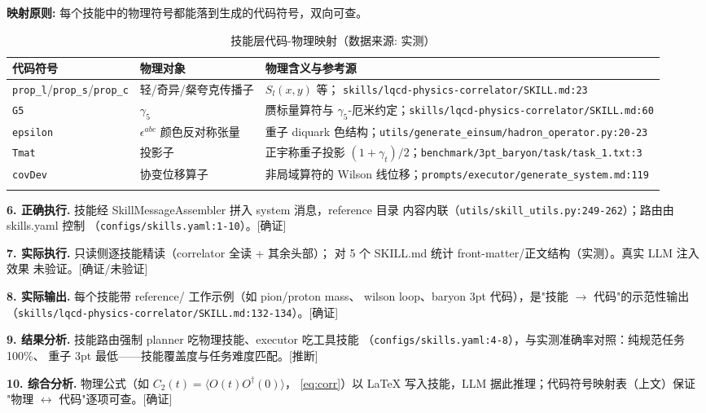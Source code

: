 \documentclass[UTF8]{ctexart}
\begin{document}
\begin{mapbox}
\textbf{映射原则:} 每个技能中的物理符号都能落到生成的代码符号，双向可查。
\end{mapbox}

\begin{xltabular}{\textwidth}{llX}
\toprule
\textcolor{map}{代码符号} & 物理对象 & 物理含义与参考源 \\
\midrule
\endhead
\texttt{prop\_l}/\texttt{prop\_s}/\texttt{prop\_c} & 轻/奇异/粲夸克传播子 & $S_l(x,y)$ 等；
\texttt{\nolinkurl{skills/lqcd-physics-correlator/SKILL.md:23}} \\
\texttt{G5} & $\gamma_5$ & 赝标量算符与 $\gamma_5$-厄米约定；\texttt{\nolinkurl{skills/lqcd-physics-correlator/SKILL.md:60}} \\
\texttt{epsilon} & $\epsilon^{abc}$ 颜色反对称张量 & 重子 diquark 色结构；\texttt{\nolinkurl{utils/generate_einsum/hadron_operator.py:20-23}} \\
\texttt{Tmat} & 投影子 & 正宇称重子投影 $(1+\gamma_t)/2$；\texttt{\nolinkurl{benchmark/3pt_baryon/task/task_1.txt:3}} \\
\texttt{covDev} & 协变位移算子 & 非局域算符的 Wilson 线位移；\texttt{\nolinkurl{prompts/executor/generate_system.md:119}} \\
\bottomrule
\caption{技能层代码-物理映射（数据来源: 实测）}
\end{xltabular}

\noindent\textbf{6. 正确执行.} 技能经 SkillMessageAssembler 拼入 system 消息，reference 目录
内容内联（\texttt{\nolinkurl{utils/skill_utils.py:249-262}}）；路由由 skills.yaml 控制
（\texttt{\nolinkurl{configs/skills.yaml:1-10}}）。[确证]

\noindent\textbf{7. 实际执行.} 只读侧逐技能精读（correlator 全读 + 其余头部）；
对 5 个 SKILL.md 统计 front-matter/正文结构（实测）。真实 LLM 注入效果 \textcolor{warn}{未验证}。[确证/未验证]

\noindent\textbf{8. 实际输出.} 每个技能带 reference/ 工作示例（如 pion/proton mass、
wilson loop、baryon 3pt 代码），是"技能 $\rightarrow$ 代码"的示范性输出
（\texttt{\nolinkurl{skills/lqcd-physics-correlator/SKILL.md:132-134}}）。[确证]

\noindent\textbf{9. 结果分析.} 技能路由强制 planner 吃物理技能、executor 吃工具技能
（\texttt{\nolinkurl{configs/skills.yaml:4-8}}），与实测准确率对照：纯规范任务 100\%、
重子 3pt 最低——技能覆盖度与任务难度匹配。[推断]

\noindent\textbf{10. 综合分析.} 物理公式（如 $C_2(t)=\langle O(t)O^\dagger(0)\rangle$，
\eqref{eq:corr}）以 LaTeX 写入技能，LLM 据此推理；代码符号映射表（上文）保证
"物理 $\leftrightarrow$ 代码"逐项可查。[确证]
\end{document}
